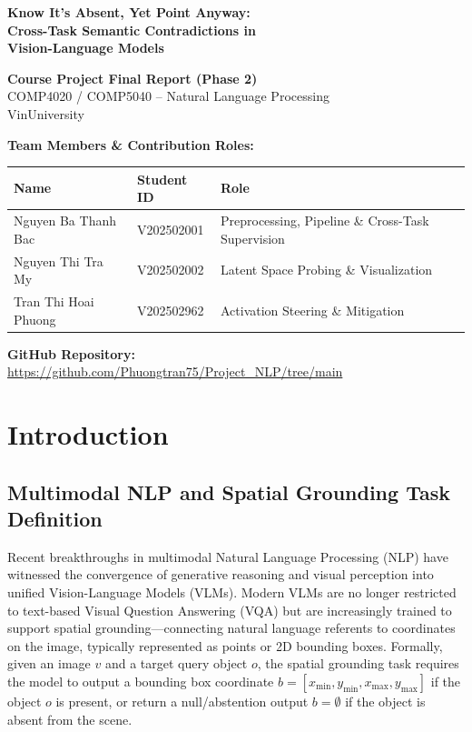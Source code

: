 \documentclass[12pt,a4paper]{article}
\begin{document}
\thispagestyle{empty}
\begin{center}
\vspace*{2cm}
{\LARGE\bfseries Know It's Absent, Yet Point Anyway:\\[6pt] Cross-Task Semantic Contradictions in\\[6pt] Vision-Language Models}

\vspace{1.5cm}
{\large\textbf{Course Project Final Report (Phase 2)}}\\[6pt]
{\large COMP4020 / COMP5040 -- Natural Language Processing}\\[6pt]
{\large VinUniversity}

\vspace{2cm}
{\large\textbf{Team Members \& Contribution Roles:}}\\[10pt]
\begin{tabular}{@{}lll@{}}
\toprule
\textbf{Name} & \textbf{Student ID} & \textbf{Role} \\
\midrule
Nguyen Ba Thanh Bac & V202502001 & Preprocessing, Pipeline \& Cross-Task Supervision \\
Nguyen Thi Tra My & V202502002 & Latent Space Probing \& Visualization \\
Tran Thi Hoai Phuong & V202502962 & Activation Steering \& Mitigation \\
\bottomrule
\end{tabular}

\vspace{1.5cm}
\textbf{GitHub Repository:}\\
\url{https://github.com/Phuongtran75/Project_NLP/tree/main}
\end{center}

\newpage
\tableofcontents
\newpage

\section{Introduction}

\subsection{Multimodal NLP and Spatial Grounding Task Definition}

Recent breakthroughs in multimodal Natural Language Processing (NLP) have witnessed the convergence of generative reasoning and visual perception into unified Vision-Language Models (VLMs). Modern VLMs are no longer restricted to text-based Visual Question Answering (VQA) but are increasingly trained to support spatial grounding---connecting natural language referents to coordinates on the image, typically represented as points or 2D bounding boxes. Formally, given an image $v$ and a target query object $o$, the spatial grounding task requires the model to output a bounding box coordinate $b = [x_{\min}, y_{\min}, x_{\max}, y_{\max}]$ if the object $o$ is present, or return a null/abstention output $b = \emptyset$ if the object is absent from the scene.
\end{document}
